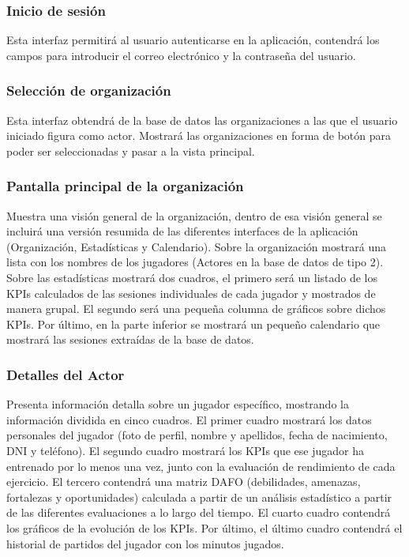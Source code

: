 \subsubsection{Inicio de sesión}
Esta interfaz permitirá al usuario autenticarse en la aplicación, contendrá los campos para introducir el correo electrónico y la contraseña del usuario.
\subsubsection{Selección de organización}
Esta interfaz obtendrá de la base de datos las organizaciones a las que el usuario iniciado figura como actor. Mostrará las organizaciones en forma de botón para poder ser seleccionadas y pasar a la vista principal.
\subsubsection{Pantalla principal de la organización}
Muestra una visión general de la organización, dentro de esa visión general se incluirá una versión resumida de las diferentes interfaces de la aplicación (Organización, Estadísticas y Calendario). Sobre la organización mostrará una lista con los nombres de los jugadores (Actores en la base de datos de tipo 2).
Sobre las estadísticas mostrará dos cuadros, el primero será un listado de los KPIs calculados de las sesiones individuales de cada jugador y mostrados de manera grupal. El segundo será una pequeña columna de gráficos sobre dichos KPIs.
Por último, en la parte inferior se mostrará un pequeño calendario que mostrará las sesiones extraídas de la base de datos.
\subsubsection{Detalles del Actor}
Presenta información detalla sobre un jugador específico, mostrando la información dividida en cinco cuadros.
El primer cuadro mostrará los datos personales del jugador (foto de perfil, nombre y apellidos, fecha de nacimiento, DNI y teléfono).
El segundo cuadro mostrará los KPIs que ese jugador ha entrenado por lo menos una vez, junto con la evaluación de rendimiento de cada ejercicio.
El tercero contendrá una matriz DAFO (debilidades, amenazas, fortalezas y oportunidades) calculada a partir de un análisis estadístico a partir de las diferentes evaluaciones a lo largo del tiempo.
El cuarto cuadro contendrá los gráficos de la evolución de los KPIs.
Por último, el último cuadro contendrá el historial de partidos del jugador con los minutos jugados.
